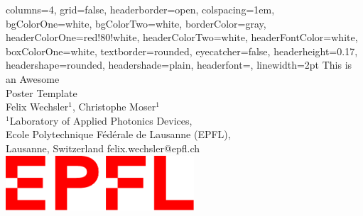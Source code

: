 \documentclass[18pt, a0paper,portrait,fontscale=0.25]{baposter}
\begin{document}
\begin{poster}
{
columns=4,
grid=false,
headerborder=open, %
colspacing=1em, %
bgColorOne=white, %
bgColorTwo=white, %
borderColor=gray, %
headerColorOne=red!80!white, %
headerColorTwo=white, %
headerFontColor=white, %
boxColorOne=white, %
textborder=rounded, %
eyecatcher=false, %
headerheight=0.17\textheight, %
headershape=rounded, %
headershade=plain,
headerfont=\Large \textsf, %
linewidth=2pt %
}
{}
%
%
{
\vspace*{0.7cm}
\textsf %
{\huge This is an Awesome\\[0.3cm] Poster Template 
}
} %
{\sf\vspace{0.2em}\\
\large Felix Wechsler$^{1}$, Christophe Moser$^{1}$
\vspace{0.1em}\\
\small{$^1$Laboratory of Applied Photonics Devices,\\Ecole Polytechnique Fédérale de Lausanne (EPFL),\\ Lausanne, Switzerland
felix.wechsler@epfl.ch\\
}}%
{
    \includegraphics[width=7cm]{figures/logo_EPFL.pdf}
}


\end{poster}
\end{document}
